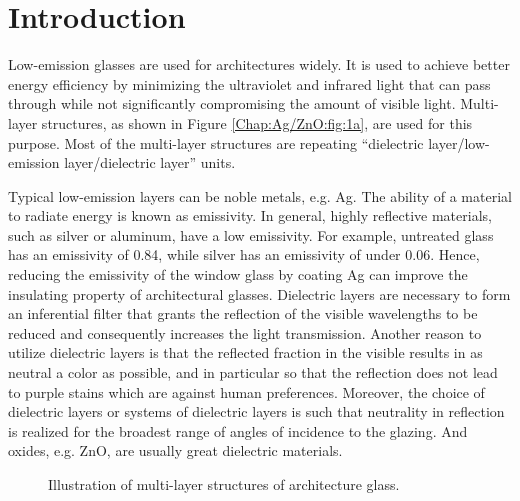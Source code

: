 \section{Introduction}

Low-emission glasses are used for architectures widely. It is used to achieve better energy efficiency by minimizing the ultraviolet and infrared light that can pass through while not significantly compromising the amount of visible light. Multi-layer structures, as shown in Figure \ref{Chap:Ag/ZnO:fig:1a}, are used for this purpose. Most of the multi-layer structures are repeating ``dielectric layer/low-emission layer/dielectric layer'' units.

Typical low-emission layers can be noble metals, e.g. Ag. The ability of a material to radiate energy is known as emissivity. In general, highly reflective materials, such as silver or aluminum, have a low emissivity. For example, untreated glass has an emissivity of 0.84, while silver has an emissivity of under 0.06. \cite{salisbury1992emissivity} Hence, reducing the emissivity of the window glass by coating Ag can improve the insulating property of architectural glasses. Dielectric layers are necessary to form an inferential filter that grants the reflection of the visible wavelengths to be reduced and consequently increases the light transmission. Another reason to utilize dielectric layers is that the reflected fraction in the visible results in as neutral a color as possible, and in particular so that the reflection does not lead to purple stains which are against human preferences. Moreover, the choice of dielectric layers or systems of dielectric layers is such that neutrality in reflection is realized for the broadest range of angles of incidence to the glazing. And oxides, e.g. ZnO, are usually great dielectric materials.

\newpage
\begingroup
\begin{figure}[!ht]
  \centering
  \label{Chap:Ag/ZnO:fig:1a}
\caption[Illustration of multi-layer structures and thin film morphology]{Illustration of multi-layer structures of architecture glass.}
  \label{Chap:Ag/ZnO:fig1}
\end{figure}
\endgroup

